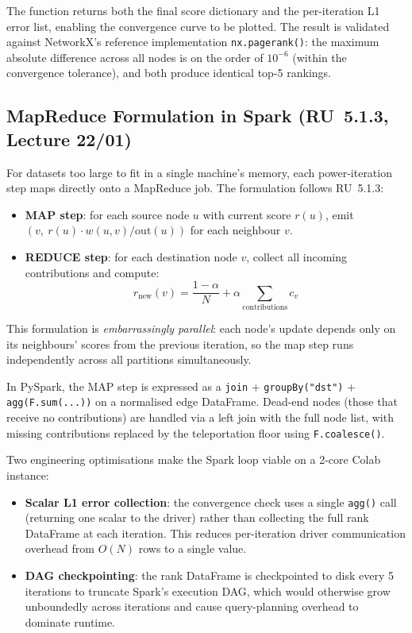 \documentclass[12pt, a4paper]{article}
\begin{document}
The function returns both the final score dictionary and the per-iteration L1 error list, enabling the convergence curve to be plotted. The result is validated against NetworkX's reference implementation \texttt{nx.pagerank()}: the maximum absolute difference across all nodes is on the order of $10^{-6}$ (within the convergence tolerance), and both produce identical top-5 rankings.

\subsection{MapReduce Formulation in Spark (RU~5.1.3, Lecture 22/01)}

For datasets too large to fit in a single machine's memory, each power-iteration step maps directly onto a MapReduce job. The formulation follows RU~5.1.3:

\begin{itemize}
  \item \textbf{MAP step}: for each source node $u$ with current score $r(u)$, emit $(v,\ r(u) \cdot w(u,v)/\mathrm{out}(u))$ for each neighbour $v$.
  \item \textbf{REDUCE step}: for each destination node $v$, collect all incoming contributions and compute:
    \[r_{\mathrm{new}}(v) = \frac{1-\alpha}{N} + \alpha \sum_{\text{contributions}} c_v\]
\end{itemize}

This formulation is \textit{embarrassingly parallel}: each node's update depends only on its neighbours' scores from the previous iteration, so the map step runs independently across all partitions simultaneously.

In PySpark, the MAP step is expressed as a \texttt{join} + \texttt{groupBy("dst")} + \texttt{agg(F.sum(...))} on a normalised edge DataFrame. Dead-end nodes (those that receive no contributions) are handled via a left join with the full node list, with missing contributions replaced by the teleportation floor using \texttt{F.coalesce()}.

Two engineering optimisations make the Spark loop viable on a 2-core Colab instance:

\begin{itemize}
  \item \textbf{Scalar L1 error collection}: the convergence check uses a single \texttt{agg()} call (returning one scalar to the driver) rather than collecting the full rank DataFrame at each iteration. This reduces per-iteration driver communication overhead from $O(N)$ rows to a single value.
  \item \textbf{DAG checkpointing}: the rank DataFrame is checkpointed to disk every 5 iterations to truncate Spark's execution DAG, which would otherwise grow unboundedly across iterations and cause query-planning overhead to dominate runtime.
\end{itemize}
\end{document}
